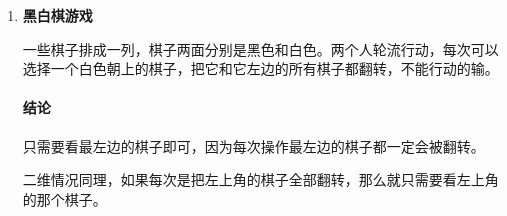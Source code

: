 \begin{enumerate}
	\item \textbf{黑白棋游戏}
	
	一些棋子排成一列，棋子两面分别是黑色和白色。两个人轮流行动，每次可以选择一个白色朝上的棋子，把它和它左边的所有棋子都翻转，不能行动的输。

	\paragraph{结论} 只需要看最左边的棋子即可，因为每次操作最左边的棋子都一定会被翻转。

	二维情况同理，如果每次是把左上角的棋子全部翻转，那么就只需要看左上角的那个棋子。

\end{enumerate}
